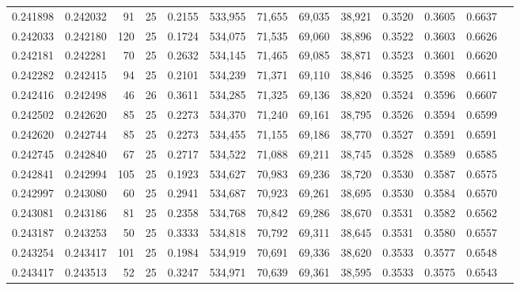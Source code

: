 \begin{tabular}{rrrrrrrrrrrrr}
0.241898 & 0.242032 &    91 &  25 &                                     0.2155 & 533,955 &  71,655 &  69,035 &  38,921 & 0.3520 & 0.3605 & 0.6637 \\
0.242033 & 0.242180 &   120 &  25 &                                     0.1724 & 534,075 &  71,535 &  69,060 &  38,896 & 0.3522 & 0.3603 & 0.6626 \\
0.242181 & 0.242281 &    70 &  25 &                                     0.2632 & 534,145 &  71,465 &  69,085 &  38,871 & 0.3523 & 0.3601 & 0.6620 \\
0.242282 & 0.242415 &    94 &  25 &                                     0.2101 & 534,239 &  71,371 &  69,110 &  38,846 & 0.3525 & 0.3598 & 0.6611 \\
0.242416 & 0.242498 &    46 &  26 &                                     0.3611 & 534,285 &  71,325 &  69,136 &  38,820 & 0.3524 & 0.3596 & 0.6607 \\
0.242502 & 0.242620 &    85 &  25 &                                     0.2273 & 534,370 &  71,240 &  69,161 &  38,795 & 0.3526 & 0.3594 & 0.6599 \\
0.242620 & 0.242744 &    85 &  25 &                                     0.2273 & 534,455 &  71,155 &  69,186 &  38,770 & 0.3527 & 0.3591 & 0.6591 \\
0.242745 & 0.242840 &    67 &  25 &                                     0.2717 & 534,522 &  71,088 &  69,211 &  38,745 & 0.3528 & 0.3589 & 0.6585 \\
0.242841 & 0.242994 &   105 &  25 &                                     0.1923 & 534,627 &  70,983 &  69,236 &  38,720 & 0.3530 & 0.3587 & 0.6575 \\
0.242997 & 0.243080 &    60 &  25 &                                     0.2941 & 534,687 &  70,923 &  69,261 &  38,695 & 0.3530 & 0.3584 & 0.6570 \\
0.243081 & 0.243186 &    81 &  25 &                                     0.2358 & 534,768 &  70,842 &  69,286 &  38,670 & 0.3531 & 0.3582 & 0.6562 \\
0.243187 & 0.243253 &    50 &  25 &                                     0.3333 & 534,818 &  70,792 &  69,311 &  38,645 & 0.3531 & 0.3580 & 0.6557 \\
0.243254 & 0.243417 &   101 &  25 &                                     0.1984 & 534,919 &  70,691 &  69,336 &  38,620 & 0.3533 & 0.3577 & 0.6548 \\
0.243417 & 0.243513 &    52 &  25 &                                     0.3247 & 534,971 &  70,639 &  69,361 &  38,595 & 0.3533 & 0.3575 & 0.6543 \\

\end{tabular}
